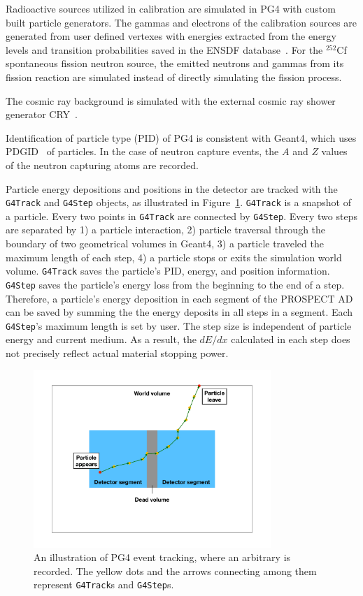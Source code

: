 Radioactive sources utilized in calibration are simulated in PG4 with custom built particle generators. 
The gammas and electrons of the calibration sources are generated from user defined vertexes with energies extracted from the energy levels and transition probabilities saved in the ENSDF database~\cite{bib:ENSDF}. 
For the $^{252}$Cf spontaneous fission neutron source, the emitted neutrons and gammas from its fission reaction are simulated instead of directly simulating the fission process. 

The cosmic ray background is simulated with the external cosmic ray shower generator CRY~\cite{bib:CRY}.


Identification of particle type (PID) of PG4 is consistent with Geant4, which uses PDGID~\cite{bib:PDG} of particles.
In the case of neutron capture events, the $A$ and $Z$ values of the neutron capturing atoms are recorded.

Particle energy depositions and positions in the detector are tracked with the \texttt{G4Track} and \texttt{G4Step} objects, as illustrated in Figure~\ref{fig:g4step}.
\texttt{G4Track} is a snapshot of a particle.
Every two points in \texttt{G4Track} are connected by \texttt{G4Step}.
Every two steps are separated by 1) a particle interaction, 2) particle traversal through the boundary of two geometrical volumes in Geant4, 3) a particle traveled the maximum length of each step, 4) a particle stops or exits the simulation world volume.
\texttt{G4Track} saves the particle's PID, energy, and position information.
\texttt{G4Step} saves the particle's energy loss from the beginning to the end of a step.
Therefore, a particle's energy deposition in each segment of the PROSPECT AD can be saved by summing the the energy deposits in all steps in a segment. 
Each \texttt{G4Step}'s maximum length is set by user.
The step size is independent of particle energy and current medium.
As a result, the $dE/dx$ calculated in each step does not precisely reflect actual material stopping power.
\begin{figure}[h!]
    \centering
    \includegraphics[width=0.8\textwidth]{Figures/G4Step.pdf}
	\caption[Illustration of PG4 event tracking]{
    An illustration of PG4 event tracking, where an arbitrary is recorded. 
    The yellow dots and the arrows connecting among them represent \texttt{G4Track}s and \texttt{G4Step}s.
    }
    \label{fig:g4step}
\end{figure}

